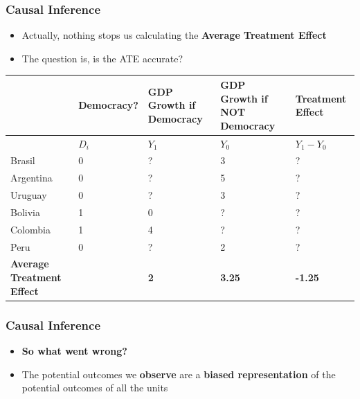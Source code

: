 \documentclass[xcolor=x11names,compress]{beamer}\usepackage[]{graphicx}\usepackage[]{xcolor}
\renewcommand{\(}{\begin{columns}}
\renewcommand{\)}{\end{columns}}
\newcommand{\<}[1]{\begin{column}{#1}}
\renewcommand{\>}{\end{column}}
\begin{document}
\begin{frame}
\frametitle{Causal Inference}
\begin{itemize}
\item Actually, nothing stops us calculating the \textbf{Average Treatment Effect}
\item The question is, is the ATE accurate?
\end{itemize}
\scriptsize
\begin{table}[htbp]
  \centering
    \begin{tabular}{|p{1.8cm}|p{1.8cm}|p{2cm}|p{2cm}|p{2cm}|}
    \hline
          & \multicolumn{1}{p{1.8cm}|}{Democracy?} & \multicolumn{1}{p{2cm}|}{GDP Growth if Democracy} & \multicolumn{1}{p{2.2cm}|}{GDP Growth if NOT Democracy} & \textbf{Treatment Effect} \bigstrut\\
    \hline
          & \multicolumn{1}{p{1.8cm}|}{$D_i$} & \multicolumn{1}{p{2cm}|}{$Y_1$} & \multicolumn{1}{p{2.2cm}|}{$Y_0$} & \multicolumn{1}{p{1.8cm}|}{$Y_{1} - Y_{0}$} \bigstrut\\
    \hline
    Brasil & 0 & ?     & 3     & ? \bigstrut\\
    \hline
    Argentina & 0 & ?    & 5     & ? \bigstrut\\
    \hline
    Uruguay & 0 & ? & 3 & ?  \bigstrut\\
    \hline
    Bolivia & 1 & 0     & ?     & ? \bigstrut\\
    \hline
    Colombia & 1 & 4    & ?    & ? \bigstrut\\
    \hline
    Peru & 0 & ?     & 2     & ? \bigstrut\\
    \hline
    \textbf{Average Treatment Effect} & & \textbf{2} & \textbf{3.25} & \textbf{-1.25} \bigstrut\\
    \hline
    \end{tabular}%
  \label{tab:addlabel}%
\end{table}%
\normalsize
\end{frame}

\begin{frame}
\frametitle{Causal Inference}
\begin{itemize}
\item \textbf{So what went wrong?}
\pause
\item The potential outcomes we \textbf{observe} are a \textbf{biased representation} of the potential outcomes of all the units
\pause
\end{itemize}
\end{frame}
\end{document}
